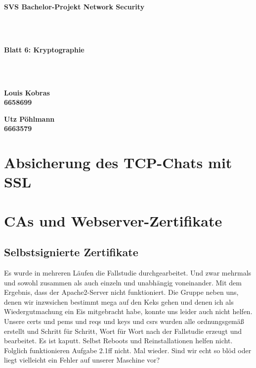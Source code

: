 \documentclass[twoside]{article}
\begin{document}
\pagestyle{fancy}
\fancyhead{}
\fancyfoot{}

\begin{center}
\begin{Huge}
\textbf{SVS Bachelor-Projekt Network Security}
\end{Huge}\\\-\\
\begin{Large}
\textbf{Blatt 6: Kryptographie}
\end{Large}\\\-\\
\begin{minipage}[t]{0.48\textwidth}
\begin{center}\textbf{
	Louis Kobras\\
	6658699}
\end{center}
\end{minipage}
\begin{minipage}[t]{0.48\textwidth}
\begin{center}\textbf{
	Utz Pöhlmann\\
	6663579}
\end{center}
\end{minipage}
\end{center}


\section{Absicherung des TCP-Chats mit SSL}
	\label{sec:tcp}
		

\section{CAs und Webserver-Zertifikate}
	\label{sec:zertifikate}
	\subsection{Selbstsignierte Zertifikate}
		\label{ssec:self-signed}
		Es wurde in mehreren Läufen die Fallstudie durchgearbeitet.
		Und zwar mehrmals und sowohl zusammen als auch einzeln und unabhängig voneinander.
		Mit dem Ergebnis, dass der Apache2-Server nicht funktioniert.
		Die Gruppe neben uns, denen wir inzwsichen bestimmt mega auf den Keks gehen und denen ich als Wiedergutmachung ein Eis mitgebracht habe, konnte uns leider auch nicht helfen.
		Unsere certs und pems und reqs und keys und csrs wurden alle ordnungsgemäß erstellt und Schritt für Schritt, Wort für Wort nach der Fallstudie erzeugt und bearbeitet.
		Es ist kaputt.
		Selbst Reboots und Reinstallationen helfen nicht.
		Folglich funktionieren Aufgabe 2.1ff nicht.
		Mal wieder.
		Sind wir echt so blöd oder liegt vielleicht ein Fehler auf unserer Maschine vor?
\end{document}
